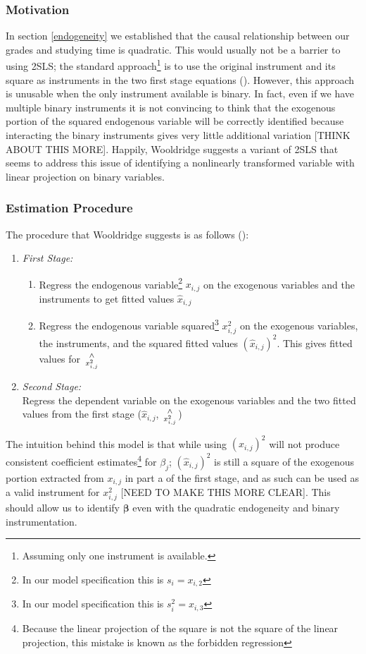 \documentclass[12pt]{article}
\begin{document}
\subsubsection{Motivation}
In section \ref{endogeneity} we established that the causal relationship between our grades and studying time is quadratic. This would usually not be a barrier to using 2SLS; the standard approach\footnote{Assuming only one instrument is available.} is to use the original instrument and its square as instruments in the two first stage equations (\cite{harmless}). However, this approach is unusable when the only instrument available is binary. In fact, even if we have multiple binary instruments it is not convincing to think that the exogenous portion of the squared endogenous variable will be correctly identified because interacting the binary instruments gives very little additional variation \textcolor{BrickRed}{[THINK ABOUT THIS MORE]}. Happily, Wooldridge suggests a variant of 2SLS that seems to address this issue of identifying a nonlinearly transformed variable with linear projection on binary variables.

\subsubsection{Estimation Procedure}
The procedure that Wooldridge suggests is as follows (\cite{wooldridge}):
\begin{spacing}{1}
\begin{enumerate}[label={(\arabic*)}]
	\item \textit{First Stage:}
	\begin{enumerate}
		\item Regress the endogenous variable\footnote{In our model specification this is $s_i = x_{i,2}$} $x_{i,j}$ on the exogenous variables and the instruments to get fitted values $\hat{x}_{i,j}$
		\item Regress the endogenous variable squared\footnote{In our model specification this is $s_i^2 = x_{i,3}$} $x_{i,j}^2$ on the exogenous variables, the instruments, and the squared fitted values $(\hat{x}_{i,j})^2$. This gives fitted values for ${\wedge \atop x_{i,j}^2}$ 
	\end{enumerate} 
	\item \textit{Second Stage:} \\
	Regress the dependent variable on the exogenous variables and the two fitted values from the first stage ($\hat{x}_{i,j}$, ${\wedge \atop x_{i,j}^2}$)
\end{enumerate}
\end{spacing}
\noindent The intuition behind this model is that while using $(\hat{x}_{i,j})^2$ will not produce consistent coefficient estimates\footnote{Because the linear projection of the square is not the square of the linear projection, this mistake is known as the forbidden regression} for $\beta_j$; $(\hat{x}_{i,j})^2$ is still a square of the exogenous portion extracted from $x_{i,j}$ in part a of the first stage, and as such can be used as a valid instrument for $x_{i,j}^2$ \textcolor{BrickRed}{[NEED TO MAKE THIS MORE CLEAR]}. This should allow us to identify $\bm{\beta}$ even with the quadratic endogeneity and binary instrumentation.
\end{document}
